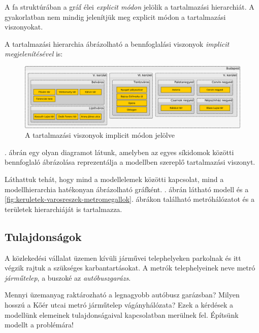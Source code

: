 \begin{megjegyzes}
	A fa struktúrában a gráf élei \emph{explicit módon} jelölik a tartalmazási hierarchiát. A gyakorlatban nem mindig jelenítjük meg explicit módon a tartalmazási viszonyokat.
	
	A tartalmazási hierarchia ábrázolható a bennfoglalási viszonyok \emph{implicit megjelenítésével} is:
	
	\begin{figure}[H]
		\centering
		\includegraphics[scale=0.4]{implicit-tartalmazas}
		\caption{A tartalmazási viszonyok implicit módon jelölve}
		\label{fig:implicit-tartalmazas}
	\end{figure}
	
	. ábrán egy olyan diagramot látunk, amelyben az egyes síkidomok közötti bennfoglaló ábrázolása reprezentálja a modellben szereplő tartalmazási viszonyt.
	
\end{megjegyzes}

Láthattuk tehát, hogy mind a modellelemek közötti kapcsolat, mind a modellhierarchia hatékonyan ábrázolható gráfként. . ábrán látható modell  és a \ref{fig:keruletek-varosreszek-metromegallok}. ábrákon található metróhálózatot és a területek hierarchiáját is tartalmazza.


\subsection{Tulajdonságok}
\label{sec:tulajdonsagok}

\begin{pelda}
A közlekedési vállalat üzemen kívüli járművei telephelyeken parkolnak és itt végzik rajtuk a szükséges karbantartásokat. A metrók telephelyeinek neve metró \emph{járműtelep}, a buszoké az \emph{autóbuszgarázs}.

Mennyi üzemanyag raktározható a legnagyobb autóbusz garázsban? Milyen hosszú a Kőér utcai metró járműtelep vágányhálózata? Ezek a kérdések a modellünk elemeinek tulajdonságaival kapcsolatban merülnek fel. Építsünk modellt a problémára!
\end{pelda}

